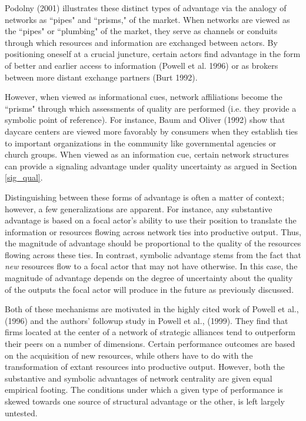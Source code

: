 Podolny (2001) illustrates these distinct types of advantage via the analogy of networks as ``pipes" and ``prisms," of the market. When networks are viewed as the ``pipes" or ``plumbing" of the market, they serve as channels or conduits through which resources and information are exchanged between actors. By positioning oneself at a crucial juncture, certain actors find advantage in the form of better and earlier access to information (Powell et al. 1996) or as brokers between more distant exchange partners (Burt 1992).

However, when viewed as informational cues, network affiliations become the ``prisms" through which assessments of quality are performed (i.e. they provide a symbolic point of reference). For instance, Baum and Oliver (1992) show that daycare centers are viewed more favorably by consumers when they establish ties to important organizations in the community like governmental agencies or church groups. When viewed as an information cue, certain network structures can provide a signaling advantage under quality uncertainty as argued in Section \ref{sig_qual}.

Distinguishing between these forms of advantage is often a matter of context; however, a few generalizations are apparent. For instance, any substantive advantage is based on a focal actor's ability to use their position to translate the information or resources flowing across network ties into productive output. Thus, the magnitude of advantage should be proportional to the quality of the resources flowing across these ties. In contrast, symbolic advantage stems from the fact that \emph{new} resources flow to a focal actor that may not have otherwise. In this case, the magnitude of advantage depends on the degree of uncertainty about the quality of the outputs the focal actor will produce in the future as previously discussed.

Both of these mechanisms are motivated in the highly cited work of Powell et al., (1996) and the authors' followup study in Powell et al., (1999). They find that firms located at the center of a network of strategic alliances tend to outperform their peers on a number of dimensions. Certain performance outcomes are based on the acquisition of new resources, while others have to do with the transformation of extant resources into productive output. However, both the substantive and symbolic advantages of network centrality are given equal empirical footing. The conditions under which a given type of performance is skewed towards one source of structural advantage or the other, is left largely untested. 

